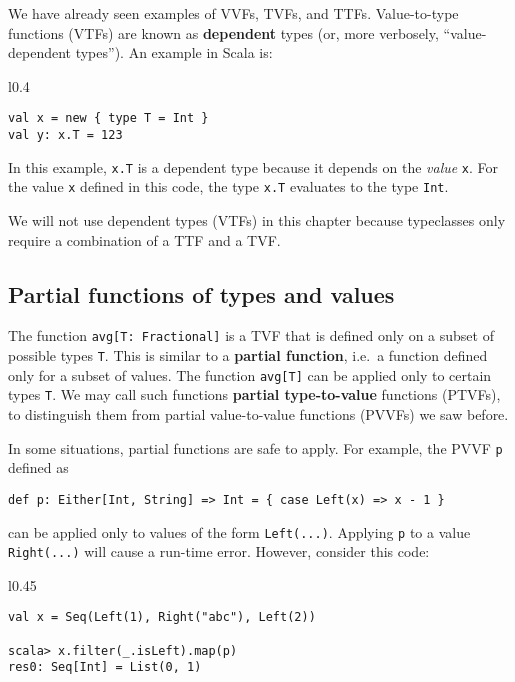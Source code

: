 We have already seen examples of VVFs, TVFs, and TTFs. Value-to-type
functions (VTFs) are known as \textbf{dependent} types
(or, more verbosely, ``value-dependent types''). An example in Scala
is:

\begin{wrapfigure}{l}{0.4\columnwidth}%
\vspace{-0.75\baselineskip}
\begin{lstlisting}
val x = new { type T = Int }
val y: x.T = 123
\end{lstlisting}

\vspace{-0.75\baselineskip}
\end{wrapfigure}%

\noindent In this example, \lstinline!x.T! is a dependent type because
it depends on the \emph{value} \lstinline!x!. For the value \lstinline!x!
defined in this code, the type \lstinline!x.T! evaluates to the type
\lstinline!Int!. 

We will not use dependent types (VTFs) in this chapter because typeclasses
only require a combination of a TTF and a TVF.

\subsection{Partial functions of types and values}

The function \lstinline!avg[T: Fractional]! is a TVF that is defined
only on a subset of possible types \lstinline!T!. This is similar
to a \textbf{partial function}, i.e.~a function
defined only for a subset of values. The function \lstinline!avg[T]!
can be applied only to certain types \lstinline!T!. We may call such
functions \textbf{partial type-to-value}
functions (PTVFs), to distinguish them from partial value-to-value
functions (PVVFs) we saw before.

In some situations, partial functions are safe to apply. For example,
the PVVF \lstinline!p! defined as 
\begin{lstlisting}
def p: Either[Int, String] => Int = { case Left(x) => x - 1 }
\end{lstlisting}
can be applied only to values of the form \lstinline!Left(...)!.
Applying \lstinline!p! to a value \lstinline!Right(...)! will cause
a run-time error. However, consider this code:

\begin{wrapfigure}{l}{0.45\columnwidth}%
\vspace{-1\baselineskip}
\begin{lstlisting}
val x = Seq(Left(1), Right("abc"), Left(2))

scala> x.filter(_.isLeft).map(p)
res0: Seq[Int] = List(0, 1)
\end{lstlisting}

\vspace{-1\baselineskip}
\end{wrapfigure}%

